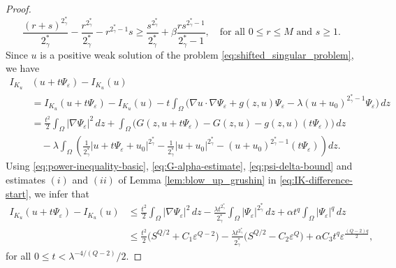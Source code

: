 \documentclass[11pt]{article}
\begin{document}
\begin{proof}
\begin{equation}\label{eq:power-inequality-refined}
\frac{(r+s)^{2_{\gamma}^*}}{2_{\gamma}^*} - \frac{r^{2_{\gamma}^*}}{2_{\gamma}^*} - r^{2_{\gamma}^* - 1} s
\ge \frac{s^{2_{\gamma}^*}}{2_{\gamma}^*} + \beta \frac{r s^{2_{\gamma}^* - 1}}{2_{\gamma}^* - 1},
\quad \text{for all } 0 \le r \le M \text{ and } s \ge 1 .
\end{equation}
Since $u$ is a positive weak solution of the problem \eqref{eq:shifted_singular_problem}, we have
\begin{equation}\label{eq:IK-difference-start}
\begin{aligned}
I_{K_u}&(u + t\Psi_\varepsilon) - I_{K_u}(u) \\
&= I_{K_u}(u + t\Psi_\varepsilon) - I_{K_u}(u)
- t \int_{\Omega} \big( \nabla u \cdot \nabla \Psi_\varepsilon + g(z,u)\Psi_\varepsilon - \lambda (u + u_{0})^{2_{\gamma}^*-1} \Psi_\varepsilon \big)\, dz \\
&= \frac{t^2}{2} \int_{\Omega} |\nabla \Psi_\varepsilon|^2 \, dz
+ \int_{\Omega} \big( G(z, u + t\Psi_\varepsilon) - G(z, u) - g(z,u)(t\Psi_\varepsilon) \big)\, dz \\
&\quad - \lambda \int_{\Omega} \left(
\frac{1}{2_{\gamma}^*} |u + t\Psi_\varepsilon + u_{0}|^{2_{\gamma}^*}
- \frac{1}{2_{\gamma}^*} |u + u_{0}|^{2_{\gamma}^*}
- (u + u_{0})^{2_{\gamma}^*-1} (t\Psi_\varepsilon)
\right) dz .
\end{aligned}
\end{equation}
Using \eqref{eq:power-inequality-basic}, \eqref{eq:G-alpha-estimate}, \eqref{eq:psi-delta-bound} and estimates $(i)$ and $(ii)$ of Lemma \ref{lem:blow_up_grushin} in \eqref{eq:IK-difference-start}, we infer that
\begin{equation}\label{eq:IK-upper-bound-small-t}
\begin{aligned}
I_{K_u}(u + t\Psi_\varepsilon) - I_{K_u}(u)
&\le \frac{t^2}{2} \int_{\Omega} |\nabla \Psi_\varepsilon|^2 \, dz
- \frac{\lambda t^{2_{\gamma}^*}}{2_{\gamma}^*} \int_{\Omega} |\Psi_\varepsilon|^{2_{\gamma}^*} \, dz
+ \alpha t^q \int_{\Omega} |\Psi_\varepsilon|^q \, dz \\
&\le \frac{t^2}{2} \big( S^{Q/2} + C_1 \varepsilon^{Q-2} \big)
- \frac{\lambda t^{2_{\gamma}^*}}{2_{\gamma}^*} \big( S^{Q/2} - C_2 \varepsilon^{Q} \big)
+ \alpha C_3 t^q \varepsilon^{\frac{(Q-2)q}{2}},
\end{aligned}
\end{equation}
for all $0 \le t < \lambda^{-4/(Q-2)}/2$.


\end{proof}
\end{document}
